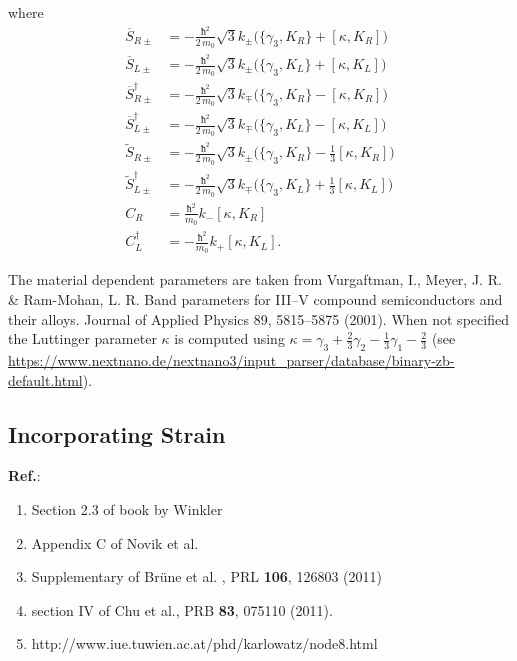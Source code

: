 \documentclass[prb,aps]{revtex4}
\begin{document}
		 where
		 \begin{align}
			\overline{S}_{R\pm} &= - \frac{ħ^2 }{2\,m_0} \sqrt{3}  k_\pm \Big( \{ γ_3 , K_R \} + [κ , K_R] \Big) \\
			\overline{S}_{L\pm} &= - \frac{ħ^2 }{2\,m_0} \sqrt{3}  k_\pm \Big( \{ γ_3 , K_L \} + [κ , K_L] \Big) \\
			\overline{S}_{R\pm}^\dagger &= - \frac{ħ^2 }{2\,m_0} \sqrt{3}  k_\mp \Big( \{ γ_3 , K_R \} - [κ , K_R] \Big) \\
			\overline{S}_{L\pm}^\dagger &= - \frac{ħ^2 }{2\,m_0} \sqrt{3}  k_\mp \Big( \{ γ_3 , K_L \} - [κ , K_L] \Big) \\
			\tilde{S}_{R\pm} &= - \frac{ħ^2 }{2\,m_0} \sqrt{3}  k_\pm \Big( \{ γ_3 , K_R \} - \frac13 [κ , K_R] \Big) \\
			\tilde{S}_{L\pm}^\dagger &= - \frac{ħ^2 }{2\,m_0} \sqrt{3}  k_\mp \Big( \{ γ_3 , K_L \} + \frac13 [κ , K_L] \Big) \\
			C_R &= \frac{ħ^2 }{m_0} k_- [κ , K_R ]\\
			C_L^\dagger &= -\frac{ħ^2 }{m_0} k_+ [κ , K_L ]  .
		\end{align}
		
		The material dependent parameters are taken from Vurgaftman, I., Meyer, J. R. \& Ram-Mohan, L. R. Band parameters for III–V compound semiconductors and their alloys. Journal of Applied Physics 89, 5815–5875 (2001). When not specified the Luttinger parameter $κ$ is computed using $κ = γ_3 + \frac{2}{3} γ_2 - \frac{1}{3} γ_1 - \frac{2}{3}$ (see \url{https://www.nextnano.de/nextnano3/input_parser/database/binary-zb-default.html}).



	\subsection{Incorporating Strain}

		{\bf Ref.}:
		\begin{enumerate}
			\item Section 2.3 of book by Winkler
			\item Appendix C of Novik et al.
			\item Supplementary of Brüne et al. , PRL {\bf 106}, 126803 (2011)
			\item section IV of Chu et al., PRB {\bf 83}, 075110 (2011).
			\item http://www.iue.tuwien.ac.at/phd/karlowatz/node8.html
		\end{enumerate}
\end{document}
